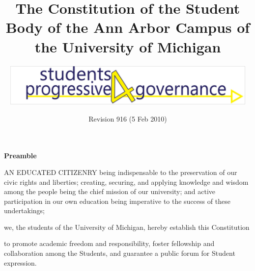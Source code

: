 \documentclass{constitution}
\begin{document}
	\title{The Constitution of the Student Body of the Ann Arbor Campus of the University of Michigan}
	\author{\includegraphics[width=5in]{S4PGlogo}}
	\date{Revision 916 (5 Feb 2010)}
	\maketitle
	\tableofcontents
	\newpage

	\pagestyle{fancy}
	\headheight 35pt
	\linenumbers
	
	\begin{center}
		\bfseries Preamble
	\end{center}

	AN EDUCATED CITIZENRY being indispensable to the preservation of our civic rights and liberties; creating, securing, and applying knowledge and wisdom among the people being the chief mission of our university; and active participation in our own education being imperative to the success of these undertakings;

		we, the students of the University of Michigan, hereby establish this Constitution

	to promote academic freedom and responsibility, foster fellowship and collaboration among the Students, and guarantee a public forum for Student expression.
	

	

	
	
	
	
	
	
	
	
	
	

	
	
	
\end{document}
